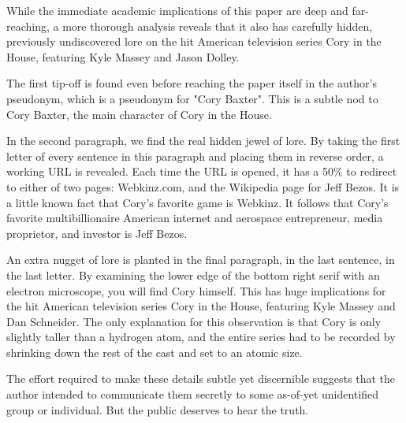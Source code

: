 \documentclass[12pt]{sigbovik-review}
\author{Skirt Steak}
\begin{document}
\maketitle

While the immediate academic implications of this paper are deep and far-reaching, a more thorough analysis reveals that it also has carefully hidden, previously undiscovered lore on the hit American television series Cory in the House, featuring Kyle Massey and Jason Dolley.

The first tip-off is found even before reaching the paper itself in the author's pseudonym, which is a pseudonym for "Cory Baxter". This is a subtle nod to Cory Baxter, the main character of Cory in the House.

In the second paragraph, we find the real hidden jewel of lore. By taking the first letter of every sentence in this paragraph and placing them in reverse order, a working URL is revealed. Each time the URL is opened, it has a 50\% to redirect to either of two pages: Webkinz.com, and the Wikipedia page for Jeff Bezos. It is a little known fact that Cory's favorite game is Webkinz. It follows that Cory's favorite multibillionaire American internet and aerospace entrepreneur, media proprietor, and investor is Jeff Bezos.

An extra nugget of lore is planted in the final paragraph, in the last sentence, in the last letter. By examining the lower edge of the bottom right serif with an electron microscope, you will find Cory himself. This has huge implications for the hit American television series Cory in the House, featuring Kyle Massey and Dan Schneider. The only explanation for this observation is that Cory is only slightly taller than a hydrogen atom, and the entire series had to be recorded by shrinking down the rest of the cast and set to an atomic size.

The effort required to make these details subtle yet discernible suggests that the author intended to communicate them secretly to some as-of-yet unidentified group or individual. But the public deserves to hear the truth.
\end{document}
